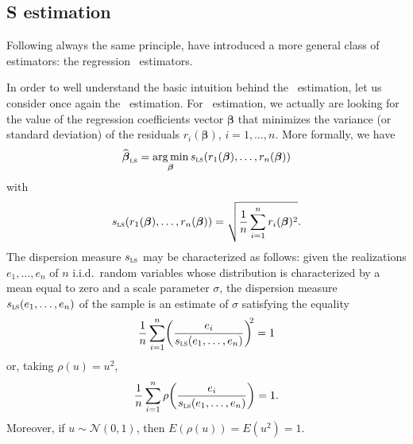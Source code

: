 \subsection{S estimation}

Following always the same principle, \citet{rousseeuw:yohai:1984} have
introduced a more general class of estimators: the regression
~estimators.

In order to well understand the basic intuition behind the ~estimation,
let us consider once again the ~estimation. For ~estimation,
we actually are looking for the value of the regression coefficients vector
$\boldsymbol{\beta}$ that minimizes the variance (or standard deviation) of the
residuals $r_i(\boldsymbol\beta)$, $i = 1, \dots, n$. More formally, we have
\[
    \sthat{\boldsymbol\beta}_\stsc{LS} 
    = \argmin_{\boldsymbol\beta} s_\stsc{LS}(r_1(\boldsymbol\beta), \dots, r_n(\boldsymbol\beta))
\]
with
\[
    s_\stsc{LS}(r_1(\boldsymbol\beta), \dots, r_n(\boldsymbol\beta)) 
    = \sqrt{\frac{1}{n}\sum_{i=1}^{n} r_i(\boldsymbol\beta)^2}.
\]
The dispersion measure $s_\stsc{LS}$ may be characterized as follows: given
the realizations $e_1, \dots, e_n$ of $n$ i.i.d.\ random variables whose
distribution is characterized by a mean equal to zero and a scale parameter
$\sigma$, the dispersion measure $s_\stsc{LS}(e_1, \dots, e_n)$ of the
sample is an estimate of $\sigma$ satisfying the equality
\[
    \frac{1}{n}\sum_{i=1}^{n} \left(\frac{e_i}{s_\stsc{LS}(e_1, \dots, e_n)}\right)^{\!\!2} = 1
\]
or, taking $\rho(u) = u^2$,
\[
    \frac{1}{n}\sum_{i=1}^{n} \rho\left(\frac{e_i}{s_\stsc{LS}(e_1, \dots, e_n)}\right) = 1.
\]
Moreover, if $u \sim \mathcal{N}(0,1)$, then $E(\rho(u)) = E(u^2) = 1$.

